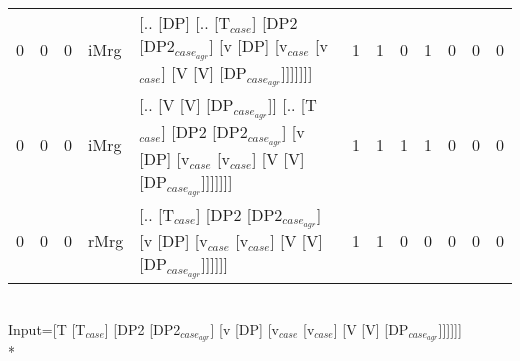 \begin{tabularx}{\linewidth}{rrrlXrrrrrrr}
   0 &       0 &   0 & iMrg & [.. [DP] [.. [T$_{case}$] [DP2 [DP2$_{case_{agr}}$] [v [DP] [v$_{case}$ [v$_{case}$] [V [V] [DP$_{case_{agr}}$]]]]]]]                                                                  &             1 &             1 &                  0 &            1 &              0 &             0 &              0 \\
   0 &       0 &   0 & iMrg & [.. [V [V] [DP$_{case_{agr}}$]] [.. [T$_{case}$] [DP2 [DP2$_{case_{agr}}$] [v [DP] [v$_{case}$ [v$_{case}$] [V [V] [DP$_{case_{agr}}$]]]]]]]                                                 &             1 &             1 &                  1 &            1 &              0 &             0 &              0 \\
   0 &       0 &   0 & rMrg & [.. [T$_{case}$] [DP2 [DP2$_{case_{agr}}$] [v [DP] [v$_{case}$ [v$_{case}$] [V [V] [DP$_{case_{agr}}$]]]]]]                                                                            &             1 &             1 &                  0 &            0 &              0 &             0 &              0 \\
\hline
\end{tabularx}\endgroup\\
\begingroup\scriptsize Input=[T [T$_{case}$] [DP2 [DP2$_{case_{agr}}$] [v [DP] [v$_{case}$ [v$_{case}$] [V [V] [DP$_{case_{agr}}$]]]]]]\\*
